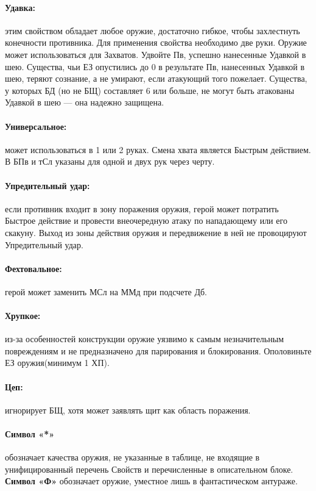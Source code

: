 \paragraph{Удавка:} этим свойством обладает любое оружие, достаточно гибкое, чтобы захлестнуть конечности противника. Для применения свойства необходимо две руки. Оружие может использоваться для Захватов. Удвойте Пв, успешно нанесенные Удавкой в шею. Существа, чьи ЕЗ опустились до 0 в результате Пв, нанесенных Удавкой в шею, теряют сознание, а не умирают, если атакующий того пожелает. Существа, у которых БД (но не БЩ) составляет 6 или больше, не могут быть атакованы Удавкой в шею — она надежно защищена.
\paragraph{Универсальное:} может использоваться в 1 или 2 руках. Смена хвата является Быстрым действием. В БПв и тСл указаны для одной и двух рук через черту.
\paragraph{Упредительный удар:} если противник входит в зону поражения оружия, герой может потратить Быстрое действие и провести внеочередную атаку по нападающему или его скакуну. Выход из зоны действия оружия и передвижение в ней не провоцируют Упредительный удар.
\paragraph{Фехтовальное:} герой может заменить МСл на ММд при подсчете Дб.
\paragraph{Хрупкое:} из-за особенностей конструкции оружие уязвимо к самым незначительным повреждениям и не предназначено для парирования и блокирования. Ополовиньте ЕЗ оружия(минимум 1 ХП).
\paragraph{Цеп:} игнорирует БЩ, хотя может заявлять щит как область поражения.
\paragraph{Символ «*»} обозначает качества оружия, не указанные в таблице, не входящие в унифицированный перечень Свойств и перечисленные в описательном блоке. \textbf{Символ «Ф»} обозначает оружие, уместное лишь в фантастическом антураже.
